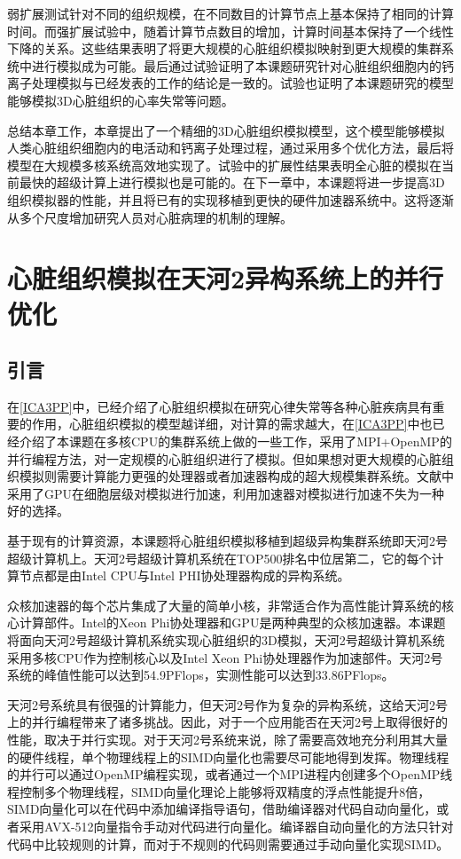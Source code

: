 弱扩展测试针对不同的组织规模，在不同数目的计算节点上基本保持了相同的计算时间。而强扩展试验中，随着计算节点数目的增加，计算时间基本保持了一个线性下降的关系。这些结果表明了将更大规模的心脏组织模拟映射到更大规模的集群系统中进行模拟成为可能。最后通过试验证明了本课题研究针对心脏组织细胞内的钙离子处理模拟与已经发表的工作的结论是一致的。试验也证明了本课题研究的模型能够模拟3D心脏组织的心率失常等问题。

总结本章工作，本章提出了一个精细的3D心脏组织模拟模型，这个模型能够模拟人类心脏组织细胞内的电活动和钙离子处理过程，通过采用多个优化方法，最后将模型在大规模多核系统高效地实现了。试验中的扩展性结果表明全心脏的模拟在当前最快的超级计算上进行模拟也是可能的。在下一章中，本课题将进一步提高3D组织模拟器的性能，并且将已有的实现移植到更快的硬件加速器系统中。这将逐渐从多个尺度增加研究人员对心脏病理的机制的理解。





\chapter{心脏组织模拟在天河2异构系统上的并行优化}
\label{icpads}

\section{引言}
在\ref{ICA3PP}中，已经介绍了心脏组织模拟在研究心律失常等各种心脏疾病具有重要的作用，心脏组织模拟的模型越详细，对计算的需求越大，在\ref{ICA3PP}中也已经介绍了本课题在多核CPU的集群系统上做的一些工作，采用了MPI+OpenMP的并行编程方法，对一定规模的心脏组织进行了模拟。但如果想对更大规模的心脏组织模拟则需要计算能力更强的处理器或者加速器构成的超大规模集群系统。文献中采用了GPU在细胞层级对模拟进行加速，利用加速器对模拟进行加速不失为一种好的选择。

基于现有的计算资源，本课题将心脏组织模拟移植到超级异构集群系统即天河2号超级计算机上。天河2号超级计算机系统在TOP500排名中位居第二，它的每个计算节点都是由Intel CPU与Intel PHI协处理器构成的异构系统。

众核加速器的每个芯片集成了大量的简单小核，非常适合作为高性能计算系统的核心计算部件。Intel的Xeon Phi协处理器和GPU是两种典型的众核加速器。本课题将面向天河2号超级计算机系统实现心脏组织的3D模拟，天河2号超级计算机系统采用多核CPU作为控制核心以及Intel Xeon Phi协处理器作为加速部件。天河2号系统的峰值性能可以达到54.9PFlops，实测性能可以达到33.86PFlops。

天河2号系统具有很强的计算能力，但天河2号作为复杂的异构系统，这给天河2号上的并行编程带来了诸多挑战。因此，对于一个应用能否在天河2号上取得很好的性能，取决于并行实现。对于天河2号系统来说，除了需要高效地充分利用其大量的硬件线程，单个物理线程上的SIMD向量化也需要尽可能地得到发挥。物理线程的并行可以通过OpenMP编程实现，或者通过一个MPI进程内创建多个OpenMP线程控制多个物理线程，SIMD向量化理论上能够将双精度的浮点性能提升8倍，SIMD向量化可以在代码中添加编译指导语句，借助编译器对代码自动向量化，或者采用AVX-512向量指令手动对代码进行向量化。编译器自动向量化的方法只针对代码中比较规则的计算，而对于不规则的代码则需要通过手动向量化实现SIMD。


